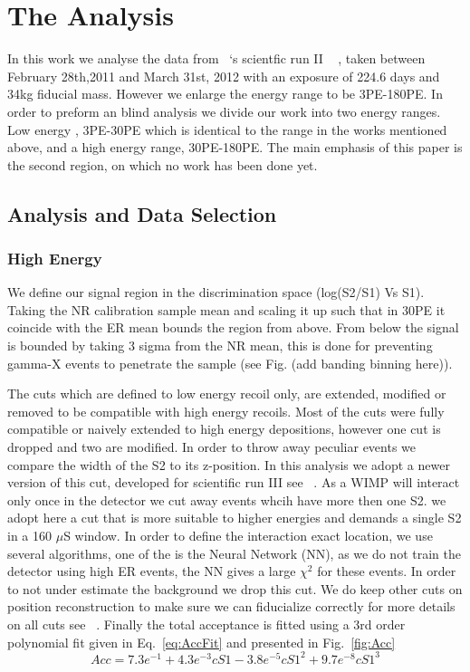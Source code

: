 \section{The Analysis}
In this work we analyse the data from \Xehund\ `s scientfic run II ~\cite{xe100_run10_si,xe100_run10_sd} , taken between February 28th,2011 and March 31st, 2012 with an exposure of 224.6 days and 34kg fiducial mass.  However we enlarge the energy range to be 3PE-180PE. In order to preform an blind analysis we divide our work into two energy ranges. Low energy , 3PE-30PE which is identical to the range in the works mentioned above, and a high energy range, 30PE-180PE. The main emphasis of this paper is the second region, on which no work has been done yet.

\subsection{Analysis and Data Selection}
\subsubsection{High Energy}
We define our signal region in the discrimination space (log(S2/S1) Vs S1). Taking the NR calibration sample mean and scaling it up such that in 30PE it coincide with the ER mean bounds the region from above. From below the signal is bounded by taking 3 sigma from the NR mean, this is done for preventing gamma-X events to penetrate the sample (see Fig. (add banding  binning here)).

The cuts which are defined to low energy recoil only, are extended, modified or removed to be compatible with high energy recoils. Most of the cuts were fully compatible or naively extended to high energy depositions, however one cut is dropped and two are modified. In order to throw away peculiar events we compare the width of the S2 to its z-position. In this analysis we adopt a newer version of this cut, developed for scientific run III see ~\cite{xe100_run_combination}. As a WIMP will interact only once in the detector we cut away events whcih have more then one S2. we adopt here a cut that is more suitable to higher energies and demands a single S2 in a 160 $\mu$S window. In order to define the interaction exact location, we use several algorithms, one of the is the Neural Network (NN), as we do not train the detector using high ER events, the NN gives a large $\chi^2$ for these events. In order to not under estimate the background we drop this cut. We do keep other cuts on position reconstruction to make sure we can fiducialize correctly for more details on all cuts see ~\cite{xe100_ana2012}. Finally the total acceptance is fitted using a 3rd order polynomial fit given in Eq.~\ref{eq:AccFit} and presented in Fig.~\ref{fig:Acc}
\begin{equation}
\label{eq:AccFit}
	Acc = 7.3e^{-1}+4.3e^{-3}cS1-3.8e^{-5}cS1^2+9.7e^{-8}cS1^3
\end{equation}


